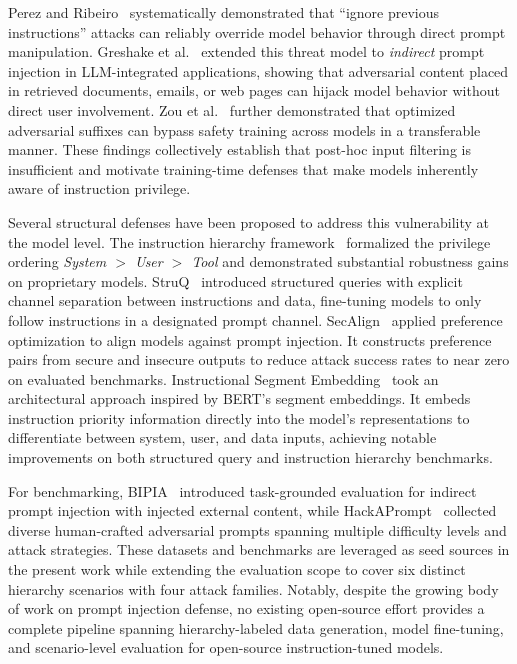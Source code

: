 \documentclass[sigconf]{acmart}
\begin{document}
Perez and Ribeiro~\cite{perez2022ignoreprevious} systematically demonstrated that ``ignore previous instructions'' attacks can reliably override model behavior through direct prompt manipulation. Greshake et al.~\cite{greshake2023youve} extended this threat model to \textit{indirect} prompt injection in LLM-integrated applications, showing that adversarial content placed in retrieved documents, emails, or web pages can hijack model behavior without direct user involvement. Zou et al.~\cite{zou2023universal} further demonstrated that optimized adversarial suffixes can bypass safety training across models in a transferable manner. These findings collectively establish that post-hoc input filtering is insufficient and motivate training-time defenses that make models inherently aware of instruction privilege.

Several structural defenses have been proposed to address this vulnerability at the model level. The instruction hierarchy framework~\cite{wallace2024instructionhierarchytrainingllms} formalized the privilege ordering \textit{System $>$ User $>$ Tool} and demonstrated substantial robustness gains on proprietary models. StruQ~\cite{chen2024struq} introduced structured queries with explicit channel separation between instructions and data, fine-tuning models to only follow instructions in a designated prompt channel. SecAlign~\cite{chen2024secalign} applied preference optimization to align models against prompt injection. It constructs preference pairs from secure and insecure outputs to reduce attack success rates to near zero on evaluated benchmarks. Instructional Segment Embedding~\cite{li2024ise} took an architectural approach inspired by BERT's segment embeddings. It embeds instruction priority information directly into the model's representations to differentiate between system, user, and data inputs, achieving notable improvements on both structured query and instruction hierarchy benchmarks.

For benchmarking, BIPIA~\cite{yi2023bipia} introduced task-grounded evaluation for indirect prompt injection with injected external content, while HackAPrompt~\cite{schulhoff2023hackaprompt} collected diverse human-crafted adversarial prompts spanning multiple difficulty levels and attack strategies. These datasets and benchmarks are leveraged as seed sources in the present work while extending the evaluation scope to cover six distinct hierarchy scenarios with four attack families. Notably, despite the growing body of work on prompt injection defense, no existing open-source effort provides a complete pipeline spanning hierarchy-labeled data generation, model fine-tuning, and scenario-level evaluation for open-source instruction-tuned models.
\end{document}

